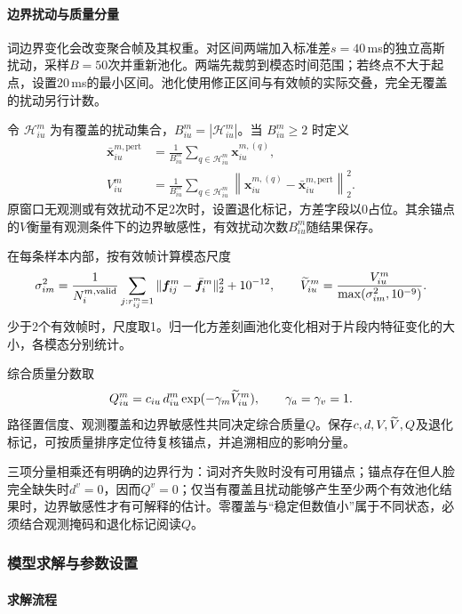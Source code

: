 \paragraph{边界扰动与质量分量}

词边界变化会改变聚合帧及其权重。对区间两端加入标准差$s=40$\,ms的独立高斯扰动，采样$B=50$次并重新池化。两端先裁剪到模态时间范围；若终点不大于起点，设置20\,ms的最小区间。池化使用修正区间与有效帧的实际交叠，完全无覆盖的扰动另行计数。

令 $\mathcal H^m_{iu}$ 为有覆盖的扰动集合，$B^m_{iu}=|\mathcal H^m_{iu}|$。当 $B^m_{iu}\ge2$ 时定义
\begin{align}
\bar{\bm x}^{m,\mathrm{pert}}_{iu}&=\frac{1}{B^m_{iu}}\sum_{q\in\mathcal H^m_{iu}}\bm x^{m,(q)}_{iu},\\
V^m_{iu}&=\frac{1}{B^m_{iu}}\sum_{q\in\mathcal H^m_{iu}}
\left\|\bm x^{m,(q)}_{iu}-\bar{\bm x}^{m,\mathrm{pert}}_{iu}\right\|_2^2.
\label{q1:eq:variance}
\end{align}
原窗口无观测或有效扰动不足2次时，设置退化标记，方差字段以0占位。其余锚点的$V$衡量有观测条件下的边界敏感性，有效扰动次数$B^m_{iu}$随结果保存。

在每条样本内部，按有效帧计算模态尺度
\begin{equation}
\sigma_{im}^2=\frac{1}{N^{m,\mathrm{valid}}_i}\sum_{j:r^m_{ij}=1}
\|\bm f^m_{ij}-\bar{\bm f}^m_i\|_2^2+10^{-12},
\qquad \widetilde V^m_{iu}=\frac{V^m_{iu}}{\max(\sigma_{im}^2,10^{-9})}.
\label{q1:eq:scale}
\end{equation}
少于2个有效帧时，尺度取1。归一化方差刻画池化变化相对于片段内特征变化的大小，各模态分别统计。

综合质量分数取
\begin{equation}
Q^m_{iu}=c_{iu}\,d^m_{iu}\exp(-\gamma_m\widetilde V^m_{iu}),\qquad \gamma_a=\gamma_v=1.
\label{q1:eq:quality}
\end{equation}
路径置信度、观测覆盖和边界敏感性共同决定综合质量$Q$。保存$c,d,V,\widetilde V,Q$及退化标记，可按质量排序定位待复核锚点，并追溯相应的影响分量。

三项分量相乘还有明确的边界行为：词对齐失败时没有可用锚点；锚点存在但人脸完全缺失时$d^v=0$，因而$Q^v=0$；仅当有覆盖且扰动能够产生至少两个有效池化结果时，边界敏感性才有可解释的估计。零覆盖与“稳定但数值小”属于不同状态，必须结合观测掩码和退化标记阅读$Q$。

\subsubsection{模型求解与参数设置}
\paragraph{求解流程}

